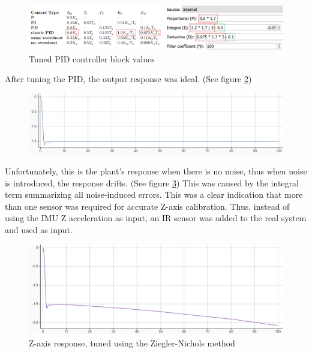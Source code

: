 \begin{figure}[H]
    \begin{center}
    \includegraphics[width = \textwidth]{pictures/control/simpidvalues}
    \end{center}
    \caption{Tuned PID controller block values}
    \label{fig:simpidvalues}
\end{figure}

After tuning the PID, the output response was ideal. (See figure \ref{fig:zpidnonoise})

\begin{figure}[H]
    \begin{center}
    \includegraphics[width = \textwidth]{pictures/control/zpidnonoise}
    \end{center}
    \caption{}
    \label{fig:zpidnonoise}
\end{figure}

Unfortunately, this is the plant's response when there is no noise, thus when noise is introduced, the response drifts. (See figure \ref{fig:zpidnoise})
This was caused by the integral term summarizing all noise-induced errors. This was a clear indication that more than one sensor was required for accurate Z-axis calibration.
Thus, instead of using the IMU Z acceleration as input, an IR sensor was added to the real system and used as input.

\begin{figure}[H]
    \begin{center}
    \includegraphics[width = \textwidth]{pictures/control/zpidnoise}
    \end{center}
    \caption{Z-axis response, tuned using the Ziegler-Nichols method}
    \label{fig:zpidnoise}
\end{figure}
